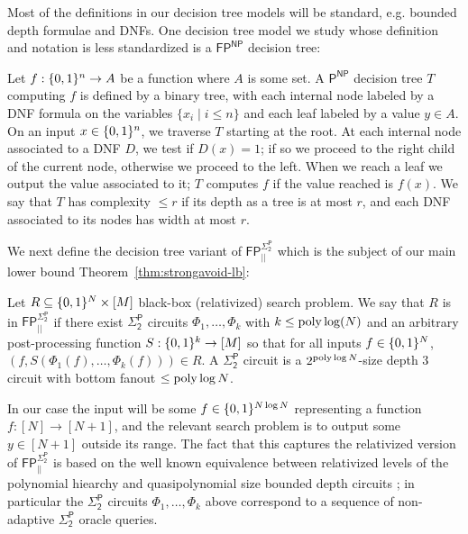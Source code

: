 Most of the definitions in our decision tree models will be standard, e.g. bounded depth formulae and DNFs.
One decision tree model we study whose definition and notation is less standardized is a $\mathsf{FP^{NP}}$ decision tree:
\begin{definition}
\label{def:PNP-trees}
Let $f: \{0,1\}^n \to A$ be a function where $A$ is some set. A $\mathsf{P^{NP}}$ decision tree $T$ computing $f$ is defined by a binary tree, with each internal node labeled by a DNF formula on the variables $\{x_i \mid i \leq n\}$ and each leaf labeled by a value $y \in A$. On an input $x \in \{0,1\}^n$, we traverse $T$ starting at the root. At each internal node associated to a DNF $D$, we test if $D(x)=1$; if so we proceed to the right child of the current node, otherwise we proceed to the left. When we reach a leaf we output the value associated to it; $T$ computes $f$ if the value reached is $f(x)$. We say that $T$ has complexity $\leq r$ if its depth as a tree is at most $r$, and each DNF associated to its nodes has width at most $r$.
\end{definition}

We next define the decision tree variant of $\mathsf{FP^{\Sigma_2^P}_{||}}$ which is the subject of our main lower bound Theorem~\ref{thm:strongavoid-lb}:
\begin{definition}\label{def:sigma-parallel}
Let $R \subseteq \{0,1\}^{N} \times [M]$ black-box (relativized) search problem. We say that $R$ is in $\mathsf{FP^{\Sigma_2^P}_{||}}$ if there exist $\mathsf{\Sigma_2^P}$ circuits $\Phi_1,\ldots,\Phi_k$ with $k \leq \mathrm{poly}\log(N)$ and an arbitrary post-processing function $S: \{0,1\}^k \to [M]$ so that for all inputs $f \in \{0,1\}^N$, $(f, S(\Phi_1(f),\ldots,\Phi_k(f))) \in R$. A $\mathsf{\Sigma_2^P}$ circuit is a $2^{\mathrm{poly}\log N}$-size depth 3 circuit with bottom fanout $\leq \mathrm{poly}\log N$.
\end{definition}

In our case the input will be some $f \in \{0,1\}^{N\log N}$ representing a function $f: [N] \to [N+1]$, and the relevant search problem is to output some $y \in [N+1]$ outside its range. The fact that this captures the relativized version of $\mathsf{FP^{\Sigma_2^P}_{||}}$ is based on the well known equivalence between relativized levels of the polynomial hiearchy and quasipolynomial size bounded depth circuits \cite{FSS}; in particular the $\mathsf{\Sigma_2^P}$ circuits $\Phi_1,\ldots,\Phi_k$ above correspond to a sequence of non-adaptive $\mathsf{\Sigma_2^P}$ oracle queries.

